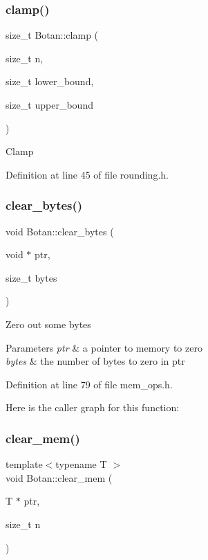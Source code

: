 \subsubsection{\texorpdfstring{clamp()}{clamp()}}
{\footnotesize\ttfamily size\+\_\+t Botan\+::clamp (\begin{DoxyParamCaption}\item[{size\+\_\+t}]{n,  }\item[{size\+\_\+t}]{lower\+\_\+bound,  }\item[{size\+\_\+t}]{upper\+\_\+bound }\end{DoxyParamCaption})\hspace{0.3cm}{\ttfamily [inline]}}

Clamp 

Definition at line 45 of file rounding.\+h.

\mbox{\label{namespace_botan_a7ce0c066e1e47c17c9ed2d4c5ae35b34}} 
\subsubsection{\texorpdfstring{clear\+\_\+bytes()}{clear\_bytes()}}
{\footnotesize\ttfamily void Botan\+::clear\+\_\+bytes (\begin{DoxyParamCaption}\item[{void $\ast$}]{ptr,  }\item[{size\+\_\+t}]{bytes }\end{DoxyParamCaption})\hspace{0.3cm}{\ttfamily [inline]}}

Zero out some bytes 
\begin{DoxyParams}{Parameters}
{\em ptr} & a pointer to memory to zero \\
\hline
{\em bytes} & the number of bytes to zero in ptr \\
\hline
\end{DoxyParams}


Definition at line 79 of file mem\+\_\+ops.\+h.

Here is the caller graph for this function\+:
\mbox{\label{namespace_botan_aeb6cf2051aa89f9d76cf4d55c126b314}} 
\subsubsection{\texorpdfstring{clear\+\_\+mem()}{clear\_mem()}}
{\footnotesize\ttfamily template$<$typename T $>$ \\
void Botan\+::clear\+\_\+mem (\begin{DoxyParamCaption}\item[{T $\ast$}]{ptr,  }\item[{size\+\_\+t}]{n }\end{DoxyParamCaption})\hspace{0.3cm}{\ttfamily [inline]}}


